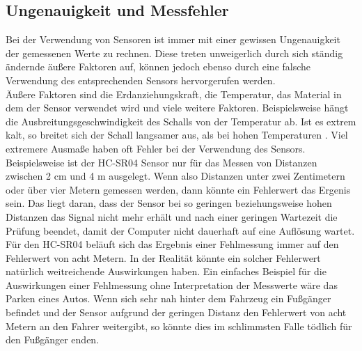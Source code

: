\subsection{Ungenauigkeit und Messfehler}
\label{ungenauigkeit_und_messfehler}
Bei der Verwendung von Sensoren ist immer mit einer gewissen Ungenauigkeit der gemessenen Werte zu rechnen. Diese treten unweigerlich durch sich ständig ändernde äußere Faktoren auf, können jedoch ebenso durch eine falsche Verwendung des entsprechenden Sensors hervorgerufen werden.\\
Äußere Faktoren sind die Erdanziehungskraft, die Temperatur, das Material in dem der Sensor verwendet wird und viele weitere Faktoren. Beispielsweise hängt die Ausbreitungsgeschwindigkeit des Schalls von der Temperatur ab. Ist es extrem kalt, so breitet sich der Schall langsamer aus, als bei hohen Temperaturen \protect{}.
Viel extremere Ausmaße haben oft Fehler bei der Verwendung des Sensors. Beispielsweise ist der HC-SR04 Sensor nur für das Messen von Distanzen zwischen 2 cm und 4 m ausgelegt. Wenn also Distanzen unter zwei Zentimetern oder über vier Metern gemessen werden, dann könnte ein Fehlerwert das Ergenis sein. Das liegt daran, dass der Sensor bei so geringen beziehungsweise hohen Distanzen das Signal nicht mehr erhält und nach einer geringen Wartezeit die Prüfung beendet, damit der Computer nicht dauerhaft auf eine Auflösung wartet. Für den HC-SR04 beläuft sich das Ergebnis einer Fehlmessung immer auf den Fehlerwert von acht Metern. In der Realität könnte ein solcher Fehlerwert natürlich weitreichende Auswirkungen haben. Ein einfaches Beispiel für die Auswirkungen einer Fehlmessung ohne Interpretation der Messwerte wäre das Parken eines Autos. Wenn sich sehr nah hinter dem Fahrzeug ein Fußgänger befindet und der Sensor aufgrund der geringen Distanz den Fehlerwert von acht Metern an den Fahrer weitergibt, so könnte dies im schlimmsten Falle tödlich für den Fußgänger enden.\\


